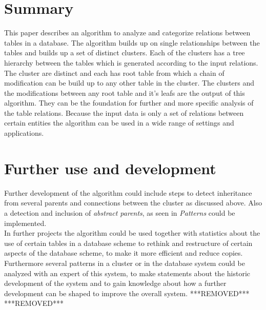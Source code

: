 \documentclass[10pt, journal, twocolumn]{IEEEtran}
\begin{document}
\section{Summary}
This paper describes an algorithm to analyze and categorize relations between tables in a database. The algorithm builds up on single relationships between the tables and builds up a set of distinct clusters. Each of the clusters has a tree hierarchy between the tables which is generated according to the input relations. The cluster are distinct and each has root table from which a chain of modification can be build up to any other table in the cluster. The clusters and the modifications between any root table and it's leafs are the output of this algorithm. They can be the foundation for further and more specific analysis of the table relations. Because the input data is only a set of relations between certain entities the algorithm can be used in a wide range of settings and applications.
\section{Further use and development}
Further development of the algorithm could include steps to detect inheritance from several parents and connections between the cluster as discussed above. Also a detection and inclusion of \textit{abstract parents}, as seen in \textit{Patterns} could be implemented. \\ In further projects the algorithm could be used together with statistics about the use of certain tables in a database scheme to rethink and restructure of certain aspects of the database scheme, to make it more efficient and reduce copies. Furthermore several patterns in a cluster or in the database system could be analyzed with an expert of this system, to make statements about the historic development of the system and to gain knowledge about how a further development can be shaped to improve the overall system.
***REMOVED***
%
***REMOVED***
\appendices
\end{document}
